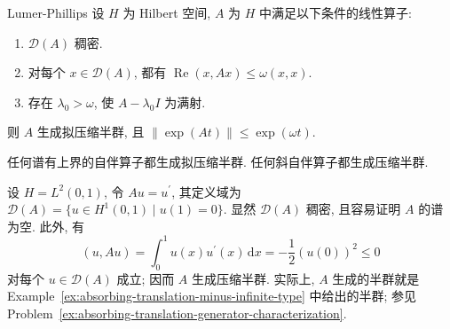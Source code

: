 \begin{Theorem}{Lumer-Phillips}
\label{thm:lumer-phillips-generation}
设 $H$ 为 Hilbert 空间, $A$ 为 $H$ 中满足以下条件的线性算子:\begin{enumerate}\item\label{hyp:lumer-phillips-dense-domain} $\mathcal{D}(A)$ 稠密.\item\label{hyp:lumer-phillips-quasidissipativity} 对每个 $x\in\mathcal{D}(A)$, 都有 $\operatorname{Re}(x,Ax)\leq\omega(x,x)$.\item\label{hyp:lumer-phillips-surjectivity} 存在 $\lambda_0>\omega$, 使 $A-\lambda_0I$ 为满射.\end{enumerate}则 $A$ 生成拟压缩半群, 且 $\|\exp(At)\|\leq\exp(\omega t)$.
\end{Theorem}

\begingroup
\renewcommand{\endProof}{\par\nobreak\hfill$\blacksquare$\par\vspace{0.1cm}}
\endgroup

\begin{Example}
\label{ex:self-skew-adjoint-semigroup-generation}
任何谱有上界的自伴算子都生成拟压缩半群. 任何斜自伴算子都生成压缩半群.
\end{Example}

\begin{Example}
\label{ex:absorbing-translation-dissipative-generator}
设 $H=L^2(0,1)$, 令 $Au=u^{\prime}$, 其定义域为 $\mathcal{D}(A)=\{u\in H^1(0,1)\mid u(1)=0\}$. 显然 $\mathcal{D}(A)$ 稠密, 且容易证明 $A$ 的谱为空. 此外, 有
\begin{equation}\label{eq:absorbing-translation-generator-dissipation-identity}
(u,Au)=\int_0^1u(x)u^{\prime}(x)\,\mathrm{d}x=-\dfrac{1}{2}(u(0))^2\leq0
\end{equation}
对每个 $u\in\mathcal{D}(A)$ 成立; 因而 $A$ 生成压缩半群. 实际上, $A$ 生成的半群就是 Example~\ref{ex:absorbing-translation-minus-infinite-type} 中给出的半群; 参见 Problem~\ref{ex:absorbing-translation-generator-characterization}.
\end{Example}

